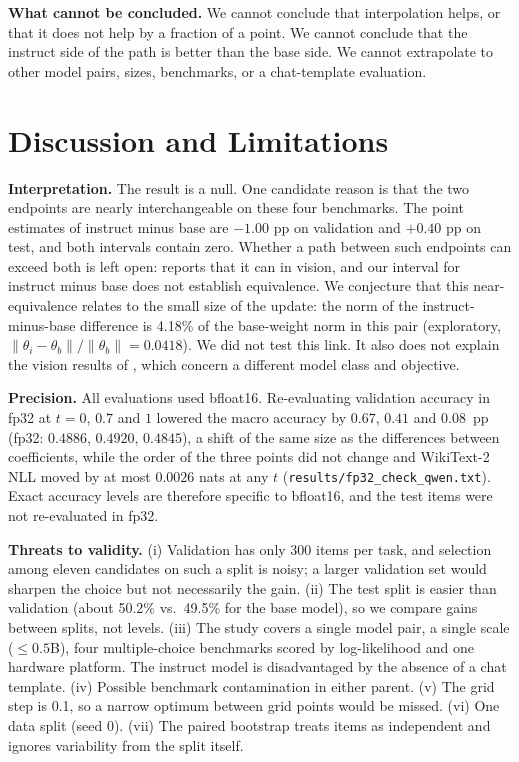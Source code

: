 \documentclass[conference]{IEEEtran}
\begin{document}
\textbf{What cannot be concluded.} We cannot conclude that interpolation helps, or that it does not help by a fraction of a point. We cannot conclude that the instruct side of the path is better than the base side. We cannot extrapolate to other model pairs, sizes, benchmarks, or a chat-template evaluation.

\section{Discussion and Limitations}
\textbf{Interpretation.} The result is a null. One candidate reason is that the two endpoints are nearly interchangeable on these four benchmarks. The point estimates of instruct minus base are $-1.00$ pp on validation and $+0.40$ pp on test, and both intervals contain zero. Whether a path between such endpoints can exceed both is left open: \cite{wortsman2022wise} reports that it can in vision, and our interval for instruct minus base does not establish equivalence. We conjecture that this near-equivalence relates to the small size of the update: the norm of the instruct-minus-base difference is 4.18\% of the base-weight norm in this pair (exploratory, $\|\theta_i-\theta_b\|/\|\theta_b\|=0.0418$). We did not test this link. It also does not explain the vision results of \cite{wortsman2022wise}, which concern a different model class and objective.

\textbf{Precision.} All evaluations used bfloat16. Re-evaluating validation accuracy in fp32 at $t=0$, $0.7$ and $1$ lowered the macro accuracy by $0.67$, $0.41$ and $0.08$~pp (fp32: $0.4886$, $0.4920$, $0.4845$), a shift of the same size as the differences between coefficients, while the order of the three points did not change and WikiText-2 NLL moved by at most $0.0026$ nats at any $t$ (\texttt{results/fp32\_check\_qwen.txt}). Exact accuracy levels are therefore specific to bfloat16, and the test items were not re-evaluated in fp32.

\textbf{Threats to validity.} (i) Validation has only 300 items per task, and selection among eleven candidates on such a split is noisy; a larger validation set would sharpen the choice but not necessarily the gain. (ii) The test split is easier than validation (about 50.2\% vs.\ 49.5\% for the base model), so we compare gains between splits, not levels. (iii) The study covers a single model pair, a single scale ($\le0.5$B), four multiple-choice benchmarks scored by log-likelihood and one hardware platform. The instruct model is disadvantaged by the absence of a chat template. (iv) Possible benchmark contamination in either parent. (v) The grid step is 0.1, so a narrow optimum between grid points would be missed. (vi) One data split (seed 0). (vii) The paired bootstrap treats items as independent and ignores variability from the split itself.
\end{document}
